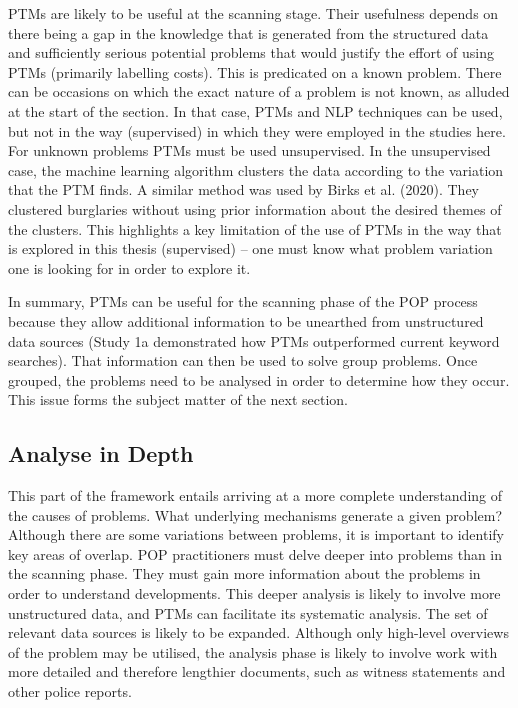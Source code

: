 PTMs are likely to be useful at the scanning stage. Their usefulness depends on there being a gap in the knowledge that is generated from the structured data and sufficiently serious potential problems that would justify the effort of using PTMs (primarily labelling costs). This is predicated on a known problem. There can be occasions on which the exact nature of a problem is not known, as alluded at the start of the section. In that case, PTMs and NLP techniques can be used, but not in the way (supervised) in which they were employed in the studies here. For unknown problems PTMs must be used unsupervised. In the unsupervised case, the machine learning algorithm clusters the data according to the variation that the PTM finds. A similar method was used by Birks et al. (2020). They clustered burglaries without using prior information about the desired themes of the clusters. This highlights a key limitation of the use of PTMs in the way that is explored in this thesis (supervised) – one must know what problem variation one is looking for in order to explore it.

In summary, PTMs can be useful for the scanning phase of the POP process because they allow additional information to be unearthed from unstructured data sources (Study 1a demonstrated how PTMs outperformed current keyword searches). That information can then be used to solve group problems. Once grouped, the problems need to be analysed in order to determine how they occur. This issue forms the subject matter of the next section.


\subsection{Analyse in Depth} This part of the framework entails arriving at a more complete understanding of the causes of problems. What underlying mechanisms generate a given problem? Although there are some variations between problems, it is important to identify key areas of overlap. POP practitioners must delve deeper into problems than in the scanning phase. They must gain more information about the problems in order to understand developments. This deeper analysis is likely to involve more unstructured data, and PTMs can facilitate its systematic analysis. The set of relevant data sources is likely to be expanded. Although only high-level overviews of the problem may be utilised, the analysis phase is likely to involve work with more detailed and therefore lengthier documents, such as witness statements and other police reports.

